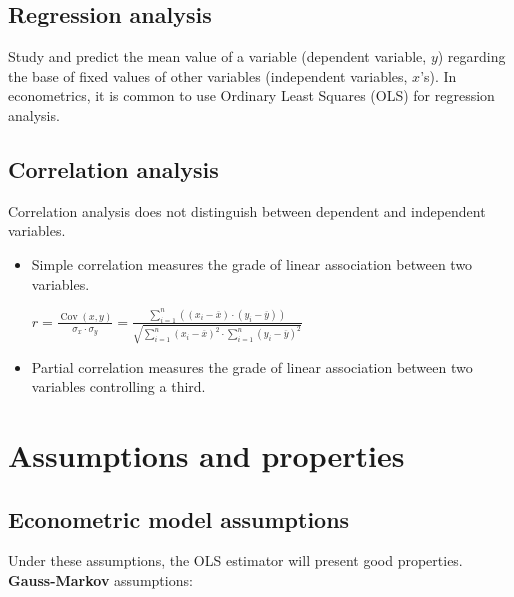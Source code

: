 \documentclass[10pt, a4paper, landscape]{article}
\DeclareMathOperator{\Cov}{Cov}
\begin{document}
\begin{multicols}{3}
\subsection*{Regression analysis}

Study and predict the mean value of a variable (dependent variable, \( y \)) regarding the base of fixed values of other variables (independent variables, \( x \)'s). In econometrics, it is common to use Ordinary Least Squares (OLS) for regression analysis.

\subsection*{Correlation analysis}

Correlation analysis does not distinguish between dependent and independent variables.

\begin{itemize}[leftmargin=*]
	\item Simple correlation measures the grade of linear association between two variables.
	\begin{center}
		\( r = \frac{\Cov(x, y)}{\sigma_{x} \cdot \sigma_{y}} = \frac{\sum_{i = 1}^{n} \left( (x_{i} - \overline{x}) \cdot (y_{i} - \overline{y}) \right)}{\sqrt{\sum_{i = 1}^{n} (x_{i} - \overline{x})^{2} \cdot \sum_{i = 1}^{n} (y_{i} - \overline{y})^{2}}} \)
	\end{center}
	\item Partial correlation measures the grade of linear association between two variables controlling a third.
\end{itemize}

\columnbreak

\section*{Assumptions and properties}

\subsection*{Econometric model assumptions}

Under these assumptions, the OLS estimator will present good properties. \textbf{Gauss-Markov} assumptions:


\end{multicols}
\end{document}
